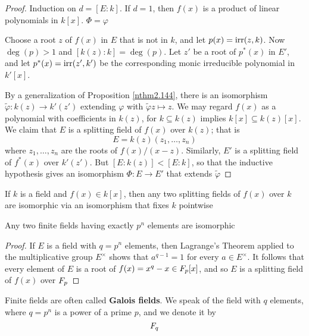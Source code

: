 \documentclass[11pt]{article}
\begin{document}
\begin{proof}
Induction on \(d=[E:k]\). If \(d=1\), then \(f(x)\) is a product of linear
polynomials in \(k[x]\). \(\Phi=\varphi\)

Choose a root \(z\) of \(f(x)\) in \(E\) that is not in \(k\), and let
\(p(x)=\operatorname{irr}(z,k)\). Now \(\deg(p)>1\) and \([k(z):k]=\deg(p)\). Let \(z'\) be
a root of \(p^*(x)\) in \(E'\), and let \(p^*(x)=\operatorname{irr}(z',k')\) be the
corresponding monic irreducible polynomial in \(k'[x]\).

By a generalization of Proposition \ref{nthm2.144}, there is an isomorphism
\(\widetilde{\varphi}:k(z)\to k'(z')\) extending \(\varphi\) with 
\(\widetilde{\varphi}z\mapsto z\). We may regard \(f(x)\) as a polynomial with
coefficients in \(k(z)\), for \(k\subseteq k(z)\) implies 
\(k[x]\subseteq k(z)[x]\). We claim that \(E\) is a splitting field of
\(f(x)\) over \(k(z)\); that is
\begin{equation*}
E=k(z)(z_1,\dots,z_n)
\end{equation*}
where \(z_1,\dots,z_n\) are the roots of \(f(x)/(x-z)\). Similarly, \(E'\) is
a splitting field of \(f^*(x)\) over \(k'(z')\). But \([E:k(z)]<[E:k]\), so
that the inductive hypothesis gives an isomorphism \(\Phi:E\to E'\) that extends
\(\widetilde{\varphi}\) 
\end{proof}

\begin{theorem}[]
If \(k\) is a field and \(f(x)\in k[x]\), then any two splitting fields of
\(f(x)\) over \(k\) are isomorphic via an isomorphism that fixes \(k\) pointwise
\end{theorem}

\begin{corollary}[Moore]
Any two finite fields having exactly \(p^n\) elements are isomorphic
\end{corollary}

\begin{proof}
If \(E\) is a field with \(q=p^n\) elements, then Lagrange's Theorem applied to
the multiplicative group \(E^\times\) shows that \(a^{q-1}=1\)  for every
\(a\in E^\times\). It follows that every element of \(E\) is a root of
\(f(x)=x^q-x\in\relax{F}_p[x]\), and so \(E\) is a splitting field of \(f(x)\) over \(\relax{F}_p\)
\end{proof}

Finite fields are often called \textbf{Galois fields}. We speak of the field with
\(q\) elements, where \(q=p^n\) is a power of a prime \(p\), and we denote it
by
\begin{equation*}
\relax{F}_q
\end{equation*}
\end{document}
